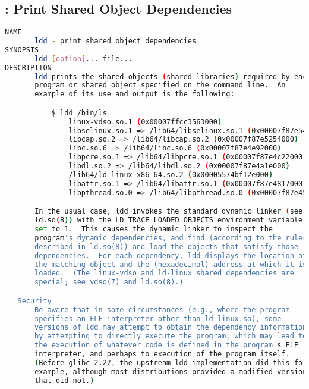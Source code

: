 % 
\subsection{: Print Shared Object Dependencies}

{\tiny{
\begin{lstlisting}[language=bash]
NAME
       ldd - print shared object dependencies
SYNOPSIS
       ldd [option]... file...
DESCRIPTION
       ldd prints the shared objects (shared libraries) required by each
       program or shared object specified on the command line.  An
       example of its use and output is the following:

           $ ldd /bin/ls
               linux-vdso.so.1 (0x00007ffcc3563000)
               libselinux.so.1 => /lib64/libselinux.so.1 (0x00007f87e5459000)
               libcap.so.2 => /lib64/libcap.so.2 (0x00007f87e5254000)
               libc.so.6 => /lib64/libc.so.6 (0x00007f87e4e92000)
               libpcre.so.1 => /lib64/libpcre.so.1 (0x00007f87e4c22000)
               libdl.so.2 => /lib64/libdl.so.2 (0x00007f87e4a1e000)
               /lib64/ld-linux-x86-64.so.2 (0x00005574bf12e000)
               libattr.so.1 => /lib64/libattr.so.1 (0x00007f87e4817000)
               libpthread.so.0 => /lib64/libpthread.so.0 (0x00007f87e45fa000)

       In the usual case, ldd invokes the standard dynamic linker (see
       ld.so(8)) with the LD_TRACE_LOADED_OBJECTS environment variable
       set to 1.  This causes the dynamic linker to inspect the
       program's dynamic dependencies, and find (according to the rules
       described in ld.so(8)) and load the objects that satisfy those
       dependencies.  For each dependency, ldd displays the location of
       the matching object and the (hexadecimal) address at which it is
       loaded.  (The linux-vdso and ld-linux shared dependencies are
       special; see vdso(7) and ld.so(8).)

   Security
       Be aware that in some circumstances (e.g., where the program
       specifies an ELF interpreter other than ld-linux.so), some
       versions of ldd may attempt to obtain the dependency information
       by attempting to directly execute the program, which may lead to
       the execution of whatever code is defined in the program's ELF
       interpreter, and perhaps to execution of the program itself.
       (Before glibc 2.27, the upstream ldd implementation did this for
       example, although most distributions provided a modified version
       that did not.)


\end{lstlisting}}}
